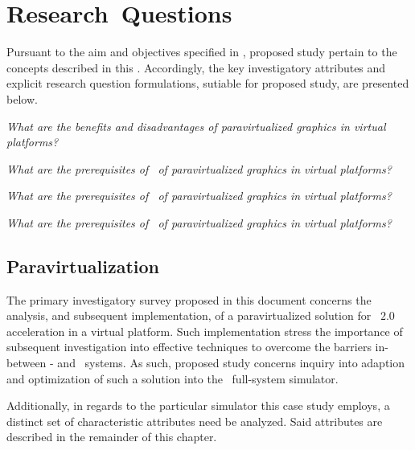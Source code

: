 
\chapter{Research~Questions}
\label{cha:researchquestions}
Pursuant to the aim and objectives specified in , proposed study pertain to the concepts described in this \termcha .
Accordingly, the key investigatory attributes and explicit research question formulations, sutiable for proposed study, are presented below.

\newcommand*\researchquestionitem[2]{\item[#1:] \textit{#2}}
\begin{multicols}{2}
\begin{itemize*}
	\researchquestionitem{1}{What are the benefits and disadvantages of paravirtualized graphics in virtual platforms?}
	\researchquestionitem{2}{What are the prerequisites of \termdetexe\  of paravirtualized graphics in virtual platforms?}
	\researchquestionitem{3}{What are the prerequisites of \termcheckpointing\ of paravirtualized graphics in virtual platforms?}
	\researchquestionitem{4}{What are the prerequisites of \termrevexe\ of paravirtualized graphics in virtual platforms?}
\end{itemize*}
\end{multicols}

\section{Paravirtualization}
\label{sec:researchquestions_paravirtualization}
The primary investigatory survey proposed in this document concerns the analysis, and subsequent implementation, of a paravirtualized solution for \termopengles ~$2.0$ acceleration in a virtual platform. Such implementation stress the importance of subsequent investigation into effective techniques to overcome the barriers in-between \termtarget - and \termhost\ systems. As such, proposed study concerns inquiry into adaption and optimization of such a solution into the \termsimics\ full-system simulator.

Additionally, in regards to the particular simulator this case study employs, a distinct set of characteristic attributes need be analyzed. Said attributes are described in the remainder of this chapter.

